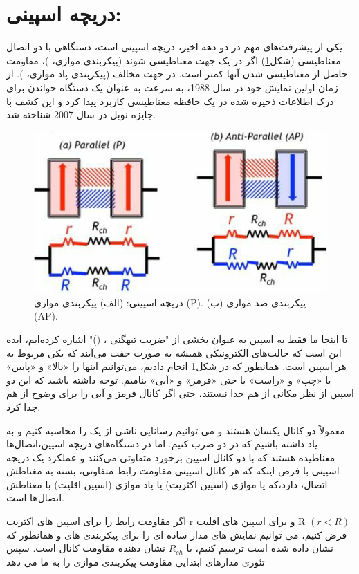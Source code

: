 \section{دریچه اسپینی:}
یکی از پیشرفت‌های مهم در دو دهه اخیر، دریچه اسپینی  است، دستگاهی با دو اتصال مغناطیسی (شکل\ref{fig:spinvalve}) اگر در یک جهت مغناطیسی شوند (پیکربندی موازی، )، مقاومت حاصل از مغناطیسی شدن آنها کمتر است. در جهت مخالف (پیکربندی پاد موازی، ). از زمان اولین نمایش خود در سال 1988، به سرعت به عنوان یک دستگاه خواندن برای درک اطلاعات ذخیره شده در یک حافظه مغناطیسی کاربرد پیدا کرد و این کشف با جایزه نوبل در سال 2007 شناخته شد.
\begin{figure}[!ht]
  \includegraphics[width=1\linewidth]{./figures/spinvalve.png}
  \caption{دریچه اسپینی: (الف) پیکربندی موازی (P). (ب) پیکربندی ضد موازی (AP).}
  \label{fig:spinvalve}
\end{figure}
تا اینجا ما فقط به اسپین به عنوان بخشی از "ضریب تبهگنی ، ()" اشاره کرده‌ایم، ایده این است که حالت‌های الکترونیکی همیشه به صورت جفت می‌آیند که یکی مربوط به هر اسپین است. همانطور که در شکل\ref{fig:spinvalve} انجام دادیم، می‌توانیم اینها را «بالا» و «پایین» یا «چپ» و «راست» یا حتی «قرمز» و «آبی» بنامیم. توجه داشته باشید که این دو اسپین از نظر مکانی از هم جدا نیستند، حتی اگر کانال قرمز و آبی را برای وضوح از هم جدا کرد.

معمولاً دو کانال یکسان هستند و می توانیم رسانایی ناشی از یک را محاسبه کنیم و به یاد داشته باشیم که در دو ضرب کنیم. اما در دستگاه‌های دریچه اسپین،اتصال‌ها مغناطیده هستند که با دو کانال اسپین برخورد متفاوتی می‌کنند و عملکرد یک دریچه اسپینی با فرض اینکه که هر کانال اسپینی مقاومت رابط  متفاوتی، بسته به مغناطش اتصال، دارد،که یا موازی (اسپین اکثریت) یا پاد موازی (اسپین اقلیت) با مغناطش اتصال‌ها است.

اگر مقاومت رابط را برای اسپین های اکثریت r و برای اسپین های اقلیت R $(r < R)$ فرض کنیم، می توانیم نمایش های مدار ساده ای را برای پیکربندی های  و  همانطور که نشان داده شده است ترسیم کنیم، با $R_{ch}$ نشان دهنده مقاومت کانال است. سپس تئوری مدارهای ابتدایی مقاومت پیکربندی موازی را به ما می دهد

